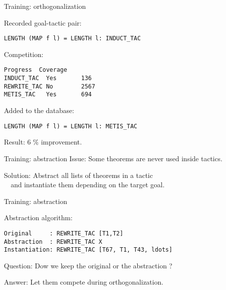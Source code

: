 \documentclass{beamer}
\begin{document}
\begin{frame}[fragile]{Training: orthogonalization}

Recorded goal-tactic pair:
\begin{lstlisting}[language=SMLSmall]
LENGTH (MAP f l) = LENGTH l: INDUCT_TAC
\end{lstlisting}

Competition:
\begin{lstlisting}[language=SMLSmall]
            Progress  Coverage 
INDUCT_TAC  Yes       136
REWRITE_TAC No        2567
METIS_TAC   Yes       694
\end{lstlisting}

Added to the database:
\begin{lstlisting}[language=SMLSmall]
LENGTH (MAP f l) = LENGTH l: METIS_TAC
\end{lstlisting}

\vspace{5mm}

Result: 6 \% improvement.
\end{frame}

\begin{frame}{Training: abstraction}
Issue: Some theorems are never used inside tactics.

\vspace{5mm}

Solution: Abstract all lists of theorems in a tactic\\ \ \ 
and instantiate them depending on the target goal.
\end{frame}

\begin{frame}[fragile]{Training: abstraction}

Abstraction algorithm:
\begin{lstlisting}[language=SMLSmall]
Original     : REWRITE_TAC [T1,T2]
Abstraction  : REWRITE_TAC X
Instantiation: REWRITE_TAC [T67, T1, T43, ldots]
\end{lstlisting}

\vspace{5mm}

Question: Dow we keep the original or the abstraction ?\\

\vspace{5mm}

Answer: Let them compete during orthogonalization.\\



\end{frame}
\end{document}
